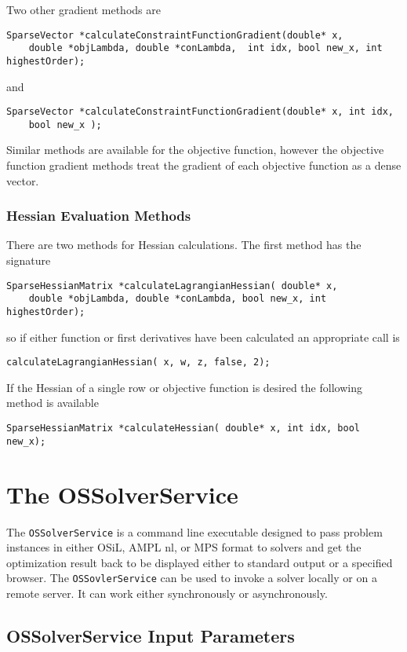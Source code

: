 \documentclass[11pt]{article}
\renewcommand{\_}{{\char"5F}}
\renewcommand{\{}{{\char"7B}}
\renewcommand{\}}{{\char"7D}}
\renewcommand{\^}{{\char"0D}}
\renewcommand{\'}{{\char"0D}}
\begin{document}
Two other gradient methods are
\begin{verbatim}
SparseVector *calculateConstraintFunctionGradient(double* x,
    double *objLambda, double *conLambda,  int idx, bool new_x, int highestOrder);
\end{verbatim}
and
\begin{verbatim}
SparseVector *calculateConstraintFunctionGradient(double* x, int idx,
    bool new_x );
\end{verbatim}

Similar methods are available for the objective function, however the objective function gradient methods treat the gradient of each objective function as a dense vector.


\subsubsection{Hessian Evaluation Methods}

There are two methods for Hessian calculations.  The first method has the signature
\begin{verbatim}
SparseHessianMatrix *calculateLagrangianHessian( double* x,
    double *objLambda, double *conLambda, bool new_x, int highestOrder);
\end{verbatim}
so if either function or first derivatives have been calculated an appropriate call is
\begin{verbatim}
calculateLagrangianHessian( x, w, z, false, 2);
\end{verbatim}
If the Hessian of a single row or objective function is desired the following method is available
\begin{verbatim}
SparseHessianMatrix *calculateHessian( double* x, int idx, bool new_x);
\end{verbatim}

\section{The OSSolverService}\label{section:ossolverservice}

The {\tt OSSolverService} is a command line executable designed to pass problem instances in either  OSiL, AMPL nl, or MPS format  to solvers and get the optimization result back to be displayed either to standard output or a specified browser.  The {\tt OSSovlerService} can be used to invoke a solver locally or on a remote server. It can work either synchronously or asynchronously.

\subsection{OSSolverService Input Parameters}
\end{document}
